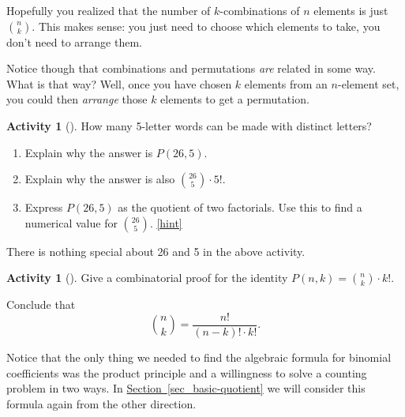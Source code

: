 \documentclass[10pt,]{book}
\theoremstyle{plain}
\theoremstyle{definition}
\theoremstyle{definition}
\theoremstyle{definition}
\newtheorem{activity}[project]{Activity}
\numberwithin{equation}{chapter}
\begin{document}
\hypertarget{p-664}{}%
Hopefully you realized that the number of \(k\)-combinations of \(n\) elements is just \(\binom{n}{k}\).  This makes sense: you just need to choose which elements to take, you don't need to arrange them.%
\par
\hypertarget{p-665}{}%
Notice though that combinations and permutations \emph{are} related in some way.  What is that way?  Well, once you have chosen \(k\) elements from an \(n\)-element set, you could then \emph{arrange} those \(k\) elements to get a permutation.%
\begin{activity}[]\label{activity-85}
\hypertarget{p-666}{}%
How many 5-letter words can be made with distinct letters?%
\begin{enumerate}[font=\bfseries,label=(\alph*),ref=\alph*]
\item\label{task-136} \hypertarget{p-667}{}%
Explain why the answer is \(P(26,5)\).%
\item\label{task-137} \hypertarget{p-668}{}%
Explain why the answer is also \(\binom{26}{5}\cdot 5!\).%
\item\label{task-138} \hypertarget{p-669}{}%
Express \(P(26,5)\) as the quotient of two factorials.  Use this to find a numerical value for \(\binom{26}{5}\).%
\hfill{\tiny\hyperlink{a-92.c}{[hint]}\hypertarget{q-92.c}{}}\end{enumerate}
\end{activity}
\hypertarget{p-671}{}%
There is nothing special about 26 and 5 in the above activity.%
\begin{activity}[]\label{act-binomformula}
\hypertarget{p-672}{}%
Give a combinatorial proof for the identity \(P(n,k) = \binom{n}{k}\cdot k!\).%
\par
\hypertarget{p-673}{}%
Conclude that%
\begin{equation*}
\binom{n}{k} = \frac{n!}{(n-k)!\cdot k!}\text{.}
\end{equation*}
%
\end{activity}
\hypertarget{p-674}{}%
Notice that the only thing we needed to find the algebraic formula for binomial coefficients was the product principle and a willingness to solve a counting problem in two ways.  In \hyperref[sec_basic-quotient]{Section~\ref{sec_basic-quotient}} we will consider this formula again from the other direction.%
\typeout{************************************************}
\typeout{************************************************}
\end{document}
